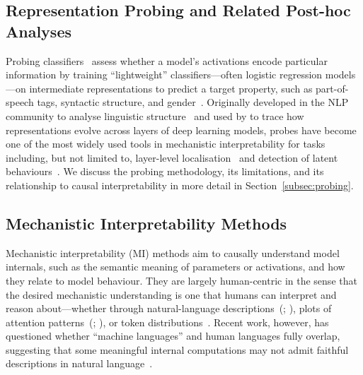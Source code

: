 \subsection{Representation Probing and Related Post-hoc Analyses}
Probing classifiers~ assess whether a model's activations encode particular information by training ``lightweight'' classifiers---often logistic regression models---on intermediate representations to predict a target property, such as part-of-speech tags, syntactic structure, and gender~. 
Originally developed in the NLP community to analyse linguistic structure~ and used by  to trace how representations evolve across layers of deep learning models, 
probes have become one of the most widely used tools in mechanistic interpretability for tasks including, but not limited to, layer-level localisation~ and detection of latent behaviours~. We discuss the probing methodology, its limitations, and its relationship to causal interpretability in more detail in Section~\ref{subsec:probing}.





\subsection{Mechanistic Interpretability Methods}
Mechanistic interpretability (MI) methods aim to causally understand model internals, such as the semantic meaning of parameters or activations, and how they relate to model behaviour. They are largely human-centric in the sense that the desired mechanistic understanding is one that humans can interpret and reason about---whether through natural-language descriptions~(; ), plots of attention patterns~(; ), or token distributions~. Recent work, however, has questioned whether ``machine languages'' and human languages fully overlap, suggesting that some meaningful internal computations may not admit faithful descriptions in natural language~.

